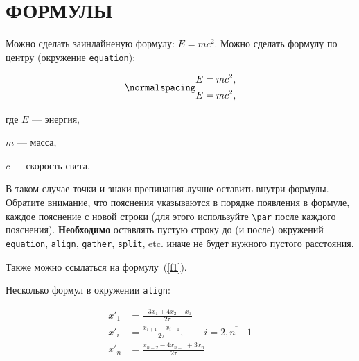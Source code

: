 \section{ФОРМУЛЫ}

Можно сделать заинлайненую формулу: $E = mc^2$. Можно сделать формулу по центру (окружение \texttt{equation}):

\begin{equation}
\normalspacing
    \label{f1}
    \begin{split}
    E = mc^2,\\
    E = mc^2,
    \end{split}
\end{equation}

где $E$ --- энергия,\par $m$ --- масса,\par $c$ --- скорость света.

В таком случае точки и знаки препинания лучше оставить внутри формулы. Обратите внимание, что пояснения указываются в порядке появления в формуле, каждое пояснение с новой строки (для этого используйте \texttt{\textbackslash par} после каждого пояснения). \textbf{Необходимо} оставлять пустую строку до (и после) окружений \texttt{equation}, \texttt{align}, \texttt{gather}, \texttt{split}, etc. иначе не будет нужного пустого расстояния.  

Также можно ссылаться на формулу~(\ref{f1}).

Несколько формул в окружении \texttt{align}:

\begin{align}
x'_1 &= \frac{-3 x_1 + 4 x_2 - x_3}{2 \tau} \\
x'_i &= \frac{x_{i+1} - x_{i-1}}{2 \tau}, \qquad i = \overline{2, n-1} \\
x'_n &= \frac{x_{n-2} - 4 x_{n-1} + 3 x_n}{2 \tau}
\end{align}

